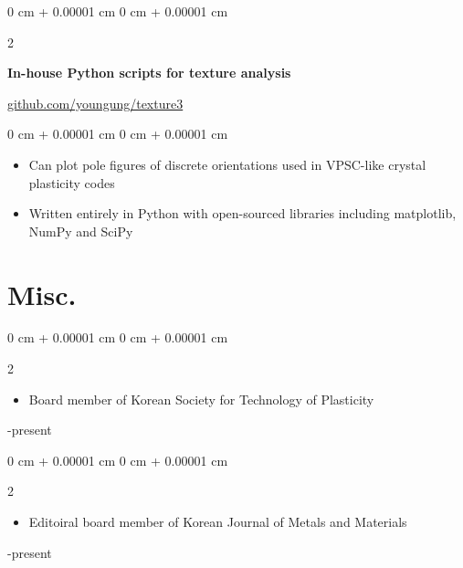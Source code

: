 \documentclass[10pt, letterpaper]{article}
\newenvironment{highlights}{
    \begin{itemize}[
        topsep=0.10 cm,
        parsep=0.10 cm,
        partopsep=0pt,
        itemsep=0pt,
        leftmargin=0 cm + 10pt
    ]
}{
    \end{itemize}
} %
\newenvironment{onecolentry}{
    \begin{adjustwidth}{
        0 cm + 0.00001 cm
    }{
        0 cm + 0.00001 cm
    }
}{
    \end{adjustwidth}
} %
\newenvironment{twocolentry}[2][]{
    \onecolentry
    \def\secondColumn{#2}
    \setcolumnwidth{\fill, 4.5 cm}
    \begin{paracol}{2}
}{
    \switchcolumn \raggedleft \secondColumn
    \end{paracol}
    \endonecolentry
} %
\begin{document}
        \vspace{0.4 cm}
        \begin{twocolentry}{\href{https://github.com/youngung/texture3}{github.com/youngung/texture3}}
            \textbf{In-house Python scripts for texture analysis}
        \end{twocolentry}
        \begin{onecolentry}
            \begin{highlights}
                \item Can plot pole figures of discrete orientations used in VPSC-like crystal plasticity codes
                \item Written entirely in Python with open-sourced libraries including matplotlib, NumPy and SciPy
            \end{highlights}
        \end{onecolentry}
        \vspace{0.2 cm}
        \section{Misc.}
        \begin{twocolentry}{2023-present}
            \begin{highlights}
                \item Board member of Korean Society for Technology of Plasticity
            \end{highlights}
        \end{twocolentry}
        \vspace{0.2 cm}
        \begin{twocolentry}{2019-present}
            \begin{highlights}
                \item Editoiral board member of Korean Journal of Metals and Materials
            \end{highlights}
        \end{twocolentry}
    \vspace{0.2 cm}
    \newpage
\end{document}
